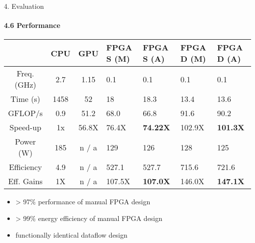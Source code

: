 \begin{frame}{4. Evaluation}
  \framesubtitle{4.6 Performance}

  {\small
    \begin{table}
      \renewcommand{\arraystretch}{1.4}
      \begin{tabular}{c|c|c|p{1cm}|p{1cm}|p{1cm}|p{1cm}}
                   & \textbf{CPU} & \textbf{GPU} & \textbf{FPGA S (M)} & \textbf{FPGA S (A)} & \textbf{FPGA D (M)} & \textbf{FPGA D (A)} \\
        \hline \hline
        Freq.(GHz) & 2.7          & 1.15         & 0.1                 & 0.1                 & 0.1                 & 0.1                 \\
        Time (s)   & 1458         & 52           & 18                  & 18.3                & 13.4                & 13.6                \\
        GFLOP/s    & 0.9          & 51.2         & 68.0                & 66.8                & 91.6                & 90.2              \\
        Speed-up   & 1x           & 56.8X        & 76.4X               & \textbf{74.22X}              & 102.9X              & \textbf{101.3X}              \\
        Power (W)  & 185          & n / a        & 129                 & 126                 & 128                 & 125                 \\
        Efficiency & 4.9          & n / a        & 527.1               & 527.7               & 715.6               & 721.6               \\
        Eff. Gains & 1X           & n / a        & 107.5X              & \textbf{107.0X}              & 146.0X              & \textbf{147.1X}              \\
      \end{tabular}
    \end{table}
  }

  \begin{itemize}
  \item > 97\% performance of manual FPGA design
  \item > 99\% energy efficiency of manual FPGA design
  \item functionally identical dataflow design
  \end{itemize}
\end{frame}


